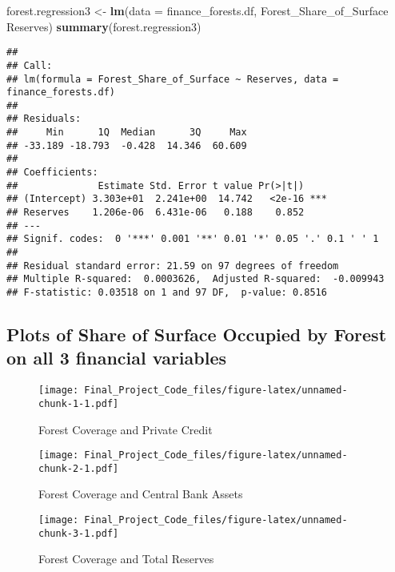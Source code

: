\documentclass[
  12pt,
]{article}
\newenvironment{Shaded}{\begin{snugshade}}{\end{snugshade}}
\newcommand{\DataTypeTok}[1]{\textcolor[rgb]{0.13,0.29,0.53}{#1}}
\newcommand{\KeywordTok}[1]{\textcolor[rgb]{0.13,0.29,0.53}{\textbf{#1}}}
\newcommand{\NormalTok}[1]{#1}
\newcommand{\OperatorTok}[1]{\textcolor[rgb]{0.81,0.36,0.00}{\textbf{#1}}}
\newcommand{\StringTok}[1]{\textcolor[rgb]{0.31,0.60,0.02}{#1}}
\begin{document}
\begin{Shaded}
\begin{Highlighting}[]
\NormalTok{forest.regression3 <-}\StringTok{ }\KeywordTok{lm}\NormalTok{(}\DataTypeTok{data =}\NormalTok{ finance_forests.df, Forest_Share_of_Surface }\OperatorTok{~}\StringTok{ }\NormalTok{Reserves)}
\KeywordTok{summary}\NormalTok{(forest.regression3)}
\end{Highlighting}
\end{Shaded}

\begin{verbatim}
## 
## Call:
## lm(formula = Forest_Share_of_Surface ~ Reserves, data = finance_forests.df)
## 
## Residuals:
##     Min      1Q  Median      3Q     Max 
## -33.189 -18.793  -0.428  14.346  60.609 
## 
## Coefficients:
##              Estimate Std. Error t value Pr(>|t|)    
## (Intercept) 3.303e+01  2.241e+00  14.742   <2e-16 ***
## Reserves    1.206e-06  6.431e-06   0.188    0.852    
## ---
## Signif. codes:  0 '***' 0.001 '**' 0.01 '*' 0.05 '.' 0.1 ' ' 1
## 
## Residual standard error: 21.59 on 97 degrees of freedom
## Multiple R-squared:  0.0003626,  Adjusted R-squared:  -0.009943 
## F-statistic: 0.03518 on 1 and 97 DF,  p-value: 0.8516
\end{verbatim}

\hypertarget{plots-of-share-of-surface-occupied-by-forest-on-all-3-financial-variables}{%
\subsection{Plots of Share of Surface Occupied by Forest on all 3
financial
variables}\label{plots-of-share-of-surface-occupied-by-forest-on-all-3-financial-variables}}

\begin{figure}
\centering
\texttt{[image: Final\_Project\_Code\_files/figure-latex/unnamed-chunk-1-1.pdf]}
\caption{Forest Coverage and Private Credit}
\end{figure}

\begin{figure}
\centering
\texttt{[image: Final\_Project\_Code\_files/figure-latex/unnamed-chunk-2-1.pdf]}
\caption{Forest Coverage and Central Bank Assets}
\end{figure}

\begin{figure}
\centering
\texttt{[image: Final\_Project\_Code\_files/figure-latex/unnamed-chunk-3-1.pdf]}
\caption{Forest Coverage and Total Reserves}
\end{figure}
\end{document}
